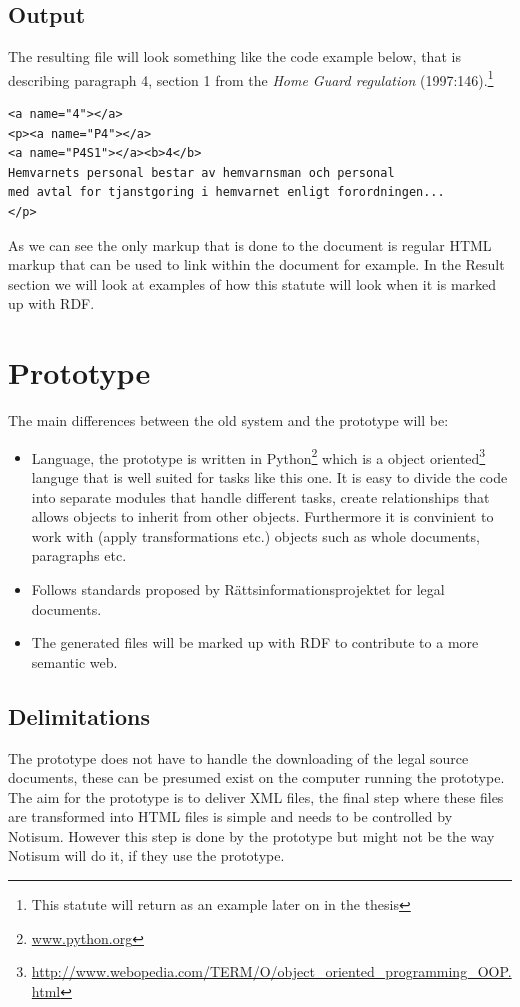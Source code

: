 \subsection{Output}
The resulting file will look something like the code example below, that is describing paragraph 4, section 1 from the \textit{Home Guard regulation} (1997:146).\footnote{This statute will return as an example later on in the thesis}\\
\begin{verbatim}
<a name="4"></a>
<p><a name="P4"></a>
<a name="P4S1"></a><b>4</b> 
Hemvarnets personal bestar av hemvarnsman och personal 
med avtal for tjanstgoring i hemvarnet enligt forordningen...
</p>
\end{verbatim}
\linebreak
\newline
As we can see the only markup that is done to the document is regular HTML markup that can be used to link within the document for example. In the Result section we will look at examples of how this statute will look when it is marked up with RDF.   

\section{Prototype}
The main differences between the old system and the prototype will be: 
\begin{itemize}
\item Language, the prototype is written in Python\footnote{\url{www.python.org}} which is a object oriented\footnote{\url{http://www.webopedia.com/TERM/O/object_oriented_programming_OOP.html}} languge that is well suited for tasks like this one. It is easy to divide the code into separate modules that handle different tasks, create relationships that allows objects to inherit from other objects. Furthermore it is convinient to work with (apply transformations etc.) objects such as whole documents, paragraphs etc. 
\item Follows standards proposed by Rättsinformationsprojektet for legal documents.   
\item The generated files will be marked up with RDF to contribute to a more semantic web. 
\end{itemize} 

\subsection{Delimitations}
The prototype does not have to handle the downloading of the legal source documents, these can be presumed exist on the computer running the prototype. \\The aim for the prototype is to deliver XML files, the final step where these files are transformed into HTML files is simple and needs to be controlled by Notisum. However this step is done by the prototype but might not be the way Notisum will do it, if they use the prototype.
